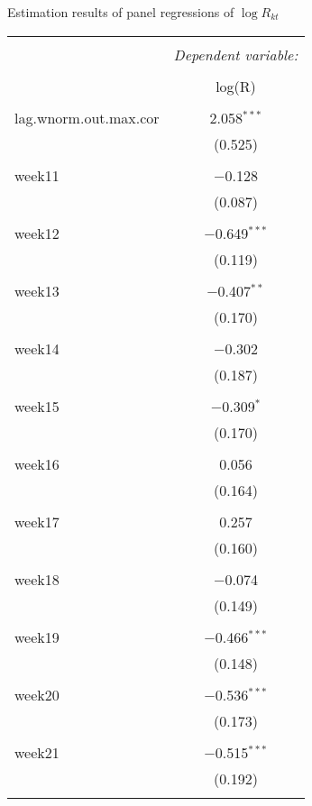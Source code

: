   \caption{Estimation results of panel regressions of $\log R_{kt}$} 
  \label{} 
\small 
\begin{tabular}{@{\extracolsep{5pt}}lc} 
\\[-1.8ex]\hline 
\hline \\[-1.8ex] 
 & \multicolumn{1}{c}{\textit{Dependent variable:}} \\ 
\cline{2-2} 
\\[-1.8ex] & log(R) \\ 
\hline \\[-1.8ex] 
 lag.wnorm.out.max.cor & 2.058$^{***}$ \\ 
  & (0.525) \\ 
  & \\ 
 week11 & $-$0.128 \\ 
  & (0.087) \\ 
  & \\ 
 week12 & $-$0.649$^{***}$ \\ 
  & (0.119) \\ 
  & \\ 
 week13 & $-$0.407$^{**}$ \\ 
  & (0.170) \\ 
  & \\ 
 week14 & $-$0.302 \\ 
  & (0.187) \\ 
  & \\ 
 week15 & $-$0.309$^{*}$ \\ 
  & (0.170) \\ 
  & \\ 
 week16 & 0.056 \\ 
  & (0.164) \\ 
  & \\ 
 week17 & 0.257 \\ 
  & (0.160) \\ 
  & \\ 
 week18 & $-$0.074 \\ 
  & (0.149) \\ 
  & \\ 
 week19 & $-$0.466$^{***}$ \\ 
  & (0.148) \\ 
  & \\ 
 week20 & $-$0.536$^{***}$ \\ 
  & (0.173) \\ 
  & \\ 
 week21 & $-$0.515$^{***}$ \\ 
  & (0.192) \\ 
  & \\ 

\end{tabular}
